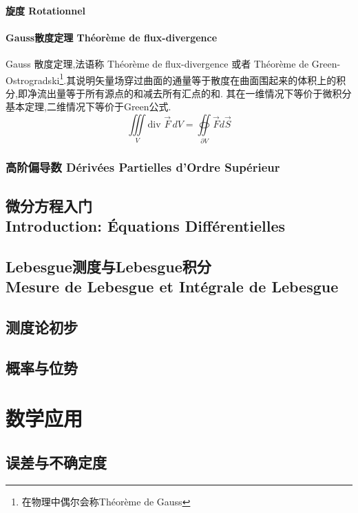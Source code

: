 \documentclass[12pt, a4paper, oneside]{ctexbook}
\begin{document}
  \subsection{旋度 Rotationnel}
  
  \subsection{Gauss散度定理 Théorème de flux-divergence}
    Gauss 散度定理,法语称 Théorème de flux-divergence 或者 Théorème de Green-Ostrogradski\footnote{在物理中偶尔会称Théorème de Gauss}.其说明矢量场穿过曲面的通量等于散度在曲面围起来的体积上的积分,即净流出量等于所有源点的和减去所有汇点的和.
    其在一维情况下等价于微积分基本定理,二维情况下等价于Green公式.
    $$
      \iiint \limits_{V} \text{div } \vec{F}\,dV=\oiint\limits_{\partial V}\vec{F} d\vec{S}  
    $$
  \section{高阶偏导数 Dérivées Partielles d'Ordre Supérieur}
  
  
  
  
  
  
  
  
  
  
  
  
  
  \chapter{微分方程入门\\Introduction: Équations Différentielles}
  \chapter{Lebesgue测度与Lebesgue积分\\ Mesure de Lebesgue et Intégrale de Lebesgue}
  \chapter{测度论初步}
  \chapter{概率与位势}  

  \part{数学应用}
  \chapter{误差与不确定度}
\end{document}
